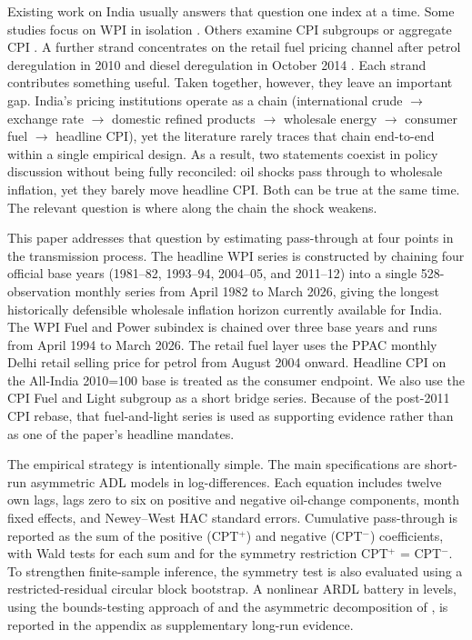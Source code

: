 \documentclass[11pt,a4paper]{article}
\begin{document}
Existing work on India usually answers that question one index at a time. Some studies focus on WPI in isolation \citep{bhoi2012,suresh2026}. Others examine CPI subgroups or aggregate CPI \citep{abubakar2018,sek2019}. A further strand concentrates on the retail fuel pricing channel after petrol deregulation in 2010 and diesel deregulation in October 2014 \citep{pradeep2022,deheri2024}. Each strand contributes something useful. Taken together, however, they leave an important gap. India's pricing institutions operate as a chain (international crude $\to$ exchange rate $\to$ domestic refined products $\to$ wholesale energy $\to$ consumer fuel $\to$ headline CPI), yet the literature rarely traces that chain end-to-end within a single empirical design. As a result, two statements coexist in policy discussion without being fully reconciled: oil shocks pass through to wholesale inflation, yet they barely move headline CPI. Both can be true at the same time. The relevant question is where along the chain the shock weakens.

This paper addresses that question by estimating pass-through at four points in the transmission process. The headline WPI series is constructed by chaining four official base years (1981--82, 1993--94, 2004--05, and 2011--12) into a single 528-observation monthly series from April 1982 to March 2026, giving the longest historically defensible wholesale inflation horizon currently available for India. The WPI Fuel and Power subindex is chained over three base years and runs from April 1994 to March 2026. The retail fuel layer uses the PPAC monthly Delhi retail selling price for petrol from August 2004 onward. Headline CPI on the All-India 2010=100 base is treated as the consumer endpoint. We also use the CPI Fuel and Light subgroup as a short bridge series. Because of the post-2011 CPI rebase, that fuel-and-light series is used as supporting evidence rather than as one of the paper's headline mandates.

The empirical strategy is intentionally simple. The main specifications are short-run asymmetric ADL models in log-differences. Each equation includes twelve own lags, lags zero to six on positive and negative oil-change components, month fixed effects, and Newey--West HAC standard errors. Cumulative pass-through is reported as the sum of the positive (CPT$^+$) and negative (CPT$^-$) coefficients, with Wald tests for each sum and for the symmetry restriction CPT$^+$ = CPT$^-$. To strengthen finite-sample inference, the symmetry test is also evaluated using a restricted-residual circular block bootstrap. A nonlinear ARDL battery in levels, using the bounds-testing approach of \citet{pesaran2001} and the asymmetric decomposition of \citet{shin2014}, is reported in the appendix as supplementary long-run evidence.
\end{document}
